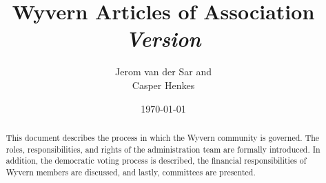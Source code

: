 \documentclass[a4paper]{article}
\title{
    Wyvern Articles of Association\\
    \vspace{10px}
    \large \textit{Version \versionnumber}
}
\author{
    Jerom van der Sar and\\
    Casper Henkes
}
\date{\today}
\begin{document}
\begin{titlepage}
    \maketitle
    \begin{abstract}
        This document describes the process in which the Wyvern community is governed. The roles, responsibilities, and rights of the administration team are formally introduced. In addition, the democratic voting process is described, the financial responsibilities of Wyvern members are discussed, and lastly, committees are presented.
    \end{abstract}
\end{titlepage}






\end{document}
